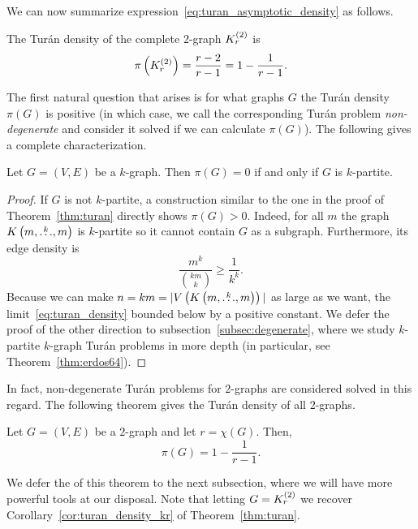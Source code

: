 We can now summarize expression~\eqref{eq:turan_asymptotic_density} as follows.
\begin{corollary} \label{cor:turan_density_kr}
    The Turán density of the complete $2$-graph $K^{(2)}_{r}$ is
    \[
        \pi\left(K^{(2)}_{r}\right) = \frac{r-2}{r-1} = 1 - \frac{1}{r-1}.
    \]
\end{corollary}

The first natural question that arises is for what graphs $G$ the Turán density $\pi(G)$ is positive
(in which case, we call the corresponding Turán problem \emph{non-degenerate}
and consider it solved if we can calculate $\pi(G)$).
The following gives a complete characterization.

\begin{proposition} \label{prop:degenerate}
    Let $G = (V, E)$ be a $k$-graph.
    Then $\pi(G) = 0$ if and only if $G$ is $k$-partite.
    \begin{proof}
        If $G$ is not $k$-partite, a construction similar to the one in the proof of Theorem~\ref{thm:turan}
        directly shows $\pi (G) > 0$.
        Indeed, for all $m$ the graph $K\left(m, \overset{k}{\dots}, m\right)$ is $k$-partite so it cannot contain $G$ as a subgraph.
        Furthermore, its edge density is
        \[
             \frac{m^k}{\binom{km}{k}} \geq \frac{1}{k^k}.
        \]
        Because we can make $n = km = |V\left( K\left(m, \overset{k}{\dots}, m\right) \right)|$ as large as we want,
        the limit~\eqref{eq:turan_density} bounded below by a positive constant.
        We defer the proof of the other direction to subsection~\ref{subsec:degenerate},
        where we study $k$-partite $k$-graph Turán problems
        in more depth (in particular, see Theorem~\ref{thm:erdos64}).
    \end{proof}
\end{proposition}

In fact, non-degenerate Turán problems for $2$-graphs are considered solved in this regard.
The following theorem gives the Turán density of all $2$-graphs.

\begin{theorem}
    \label{thm:erdos_stone_simonovits}
    Let $G = (V, E)$ be a $2$-graph and let $r = \chi(G)$.
    Then,
    \[
        \pi(G) = 1 - \frac{1}{r - 1}.
    \]
\end{theorem}

We defer the  of this theorem to the next subsection,
where we will have more powerful tools at our disposal.
Note that letting $G = K^{(2)}_{r}$ we recover
Corollary~\ref{cor:turan_density_kr} of Theorem~\ref{thm:turan}.

